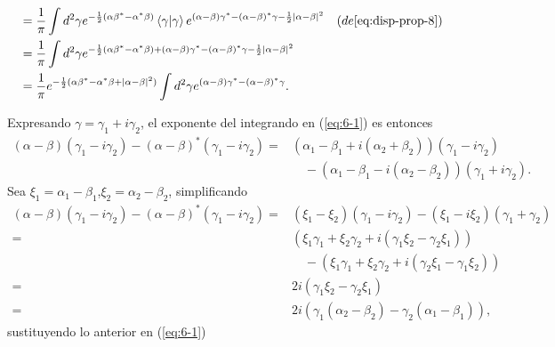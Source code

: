 \begin{enumerate}
\begin{align}
                                                                   & = \frac{1}{\pi} \int d^2 \gamma e^{-\frac{1}{2}(\alpha \beta^* - \alpha^* \beta)} \braket{\gamma}{\gamma} e^{(\alpha-\beta)\gamma^* - (\alpha-\beta)^* \gamma -\frac{1}{2}|\alpha-\beta|^2}\quad(de \ref{eq:disp-prop-8})\nonumber \\
                                                                   & = \frac{1}{\pi} \int d^2 \gamma e^{ -\frac{1}{2}(\alpha \beta^* - \alpha^* \beta) + (\alpha-\beta)\gamma^* - (\alpha-\beta)^* \gamma -\frac{1}{2}|\alpha-\beta|^2} \nonumber                                                       \\
                                                                   & = \frac{1}{\pi} e^{-\frac{1}{2}(\alpha\beta^* - \alpha^*\beta + |\alpha-\beta|^2)} \int d^2 \gamma e^{ (\alpha-\beta)\gamma^* - (\alpha-\beta)^* \gamma }. \label{eq:6-1}
        \end{align}

        Expresando $\gamma=\gamma_1 + i \gamma_2$, el exponente del integrando en (\ref{eq:6-1}) es entonces
        \begin{align}
          (\alpha-\beta)(\gamma_1 - i\gamma_2) - (\alpha-\beta)^*(\gamma_1 - i\gamma_2) = & (\alpha_1-\beta_1 + i(\alpha_2 + \beta_2))(\gamma_1 - i\gamma_2) \nonumber \\ &\quad - (\alpha_1-\beta_1 - i(\alpha_2-\beta_2))(\gamma_1+i\gamma_2).
        \end{align}
        Sea $\xi_1 = \alpha_1 - \beta_1$,$\xi_2 = \alpha_2 - \beta_2$, simplificando
        \begin{align}
          (\alpha-\beta)(\gamma_1 - i\gamma_2) - (\alpha-\beta)^*(\gamma_1 - i\gamma_2) = & (\xi_1 - \xi_2)(\gamma_1 - i\gamma_2) - (\xi_1 - i\xi_2)(\gamma_1 + \gamma_2)                                                                \nonumber \\
          =                                                                               & (\xi_1 \gamma_1 + \xi_2 \gamma_2 + i(\gamma_1\xi_2 - \gamma_2 \xi_1)) \nonumber                                                                        \\ & \quad  - (\xi_1 \gamma_1 + \xi_2 \gamma_2 + i(\gamma_2\xi_1 - \gamma_1\xi_2)) \nonumber \\
          =                                                                               & 2i(\gamma_1\xi_2 - \gamma_2\xi_1)                                                                                                            \nonumber \\
          =                                                                               & 2i(\gamma_1(\alpha_2 - \beta_2) - \gamma_2(\alpha_1 - \beta_1)),
        \end{align}
        sustituyendo lo anterior en (\ref{eq:6-1})


\end{enumerate}

